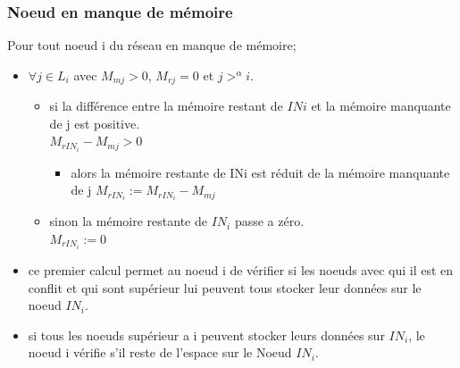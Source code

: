 \documentclass[10pt, c]{beamer}
\begin{document}
        \subsubsection{Noeud en manque de mémoire}
        	\begin{frame}{}
        	    Pour tout noeud i du réseau en manque de mémoire;
        	    \begin{itemize}
        	        \item   $\forall j \in L_i$ avec $M_{mj} >0$, $M_{rj} = 0$ et $j>^{\alpha} i$.
        	        \begin{itemize}
        	            \item si la différence entre la mémoire restant de $INi$ et la mémoire manquante de j est positive.\\
        	            $M_{rIN_{i}} - M_{mj} >0$ 
        	            \begin{itemize}
        	                \item alors la mémoire restante de INi est réduit de la mémoire manquante de j  $M_{rIN_{i}} :=M_{rIN_{i}} - M_{mj}$ 
        	            \end{itemize}
        	            \item sinon la mémoire restante de $IN_i$ passe a zéro.\\$ M_{rIN_{i}}:=0$
        	        \end{itemize}
        	        \item ce premier calcul permet au noeud i de vérifier si les noeuds avec qui il est en conflit et qui sont supérieur lui peuvent tous stocker leur données sur le noeud $IN_i$. 
        	       \item si tous les noeuds supérieur a i peuvent stocker leurs données sur $IN_i$, le noeud i vérifie s'il reste de l'espace sur le Noeud $IN_i$.
        	    \end{itemize}
        	\end{frame}
\end{document}
